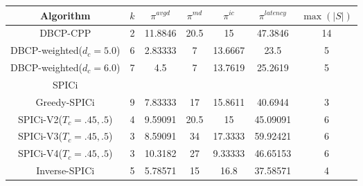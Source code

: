 \documentclass{article}
\begin{document}
	\begin{table}
		\begin{center}
			\begin{tabular}{|c|c|c|c|c|c|c|}
				\hline
				\textbf{Algorithm} & \textbf{$k$} & $\pi^{avgd}$ & \textbf{$\pi^{md}$} & \textbf{$\pi^{ic}$} & \textbf{$\pi^{latency}$} & \textbf{$\max(|S|)$} \\
				\hline
				DBCP-CPP & 2 & 11.8846 & 20.5 & 15 & 47.3846 & 14 \\
				DBCP-weighted($d_c=5.0$) & 6 & 2.83333 & 7 & 13.6667 & 23.5 & 5 \\
				DBCP-weighted($d_c=6.0$) & 7 & 4.5 & 7 & 13.7619 & 25.2619 & 5 \\
				SPICi & & & & & & \\
				Greedy-SPICi & 9 & 7.83333 & 17 & 15.8611 & 40.6944 & 3 \\
				SPICi-V2($T_c=.45,.5$) & 4 & 9.59091 & 20.5 & 15 & 45.09091 & 6 \\
				SPICi-V3($T_c=.45,.5$) & 3 & 8.59091 & 34 & 17.3333 & 59.92421 & 6 \\
				SPICi-V4($T_c=.45,.5$) & 3 & 10.3182 & 27 & 9.33333 & 46.65153 & 6 \\
				Inverse-SPICi & 5 & 5.78571 & 15 & 16.8 & 37.58571 & 4 \\
				\hline
			\end{tabular}
		\end{center}
	\end{table}
\end{document}
